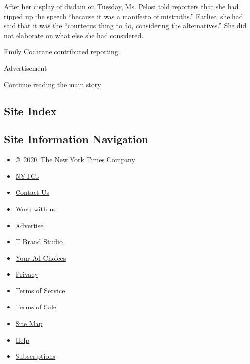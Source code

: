 After her display of disdain on Tuesday, Ms. Pelosi told reporters that
she had ripped up the speech ``because it was a manifesto of
mistruths.'' Earlier, she had said that it was the ``courteous thing to
do, considering the alternatives.'' She did not elaborate on what else
she had considered.

Emily Cochrane contributed reporting.

Advertisement

\protect\hyperlink{after-bottom}{Continue reading the main story}

\hypertarget{site-index}{%
\subsection{Site Index}\label{site-index}}

\hypertarget{site-information-navigation}{%
\subsection{Site Information
Navigation}\label{site-information-navigation}}

\begin{itemize}
\tightlist
\item
  \href{https://help.nytimes.com/hc/en-us/articles/115014792127-Copyright-notice}{©~2020~The
  New York Times Company}
\end{itemize}

\begin{itemize}
\tightlist
\item
  \href{https://www.nytco.com/}{NYTCo}
\item
  \href{https://help.nytimes.com/hc/en-us/articles/115015385887-Contact-Us}{Contact
  Us}
\item
  \href{https://www.nytco.com/careers/}{Work with us}
\item
  \href{https://nytmediakit.com/}{Advertise}
\item
  \href{http://www.tbrandstudio.com/}{T Brand Studio}
\item
  \href{https://www.nytimes.com/privacy/cookie-policy\#how-do-i-manage-trackers}{Your
  Ad Choices}
\item
  \href{https://www.nytimes.com/privacy}{Privacy}
\item
  \href{https://help.nytimes.com/hc/en-us/articles/115014893428-Terms-of-service}{Terms
  of Service}
\item
  \href{https://help.nytimes.com/hc/en-us/articles/115014893968-Terms-of-sale}{Terms
  of Sale}
\item
  \href{https://spiderbites.nytimes.com}{Site Map}
\item
  \href{https://help.nytimes.com/hc/en-us}{Help}
\item
  \href{https://www.nytimes.com/subscription?campaignId=37WXW}{Subscriptions}
\end{itemize}
